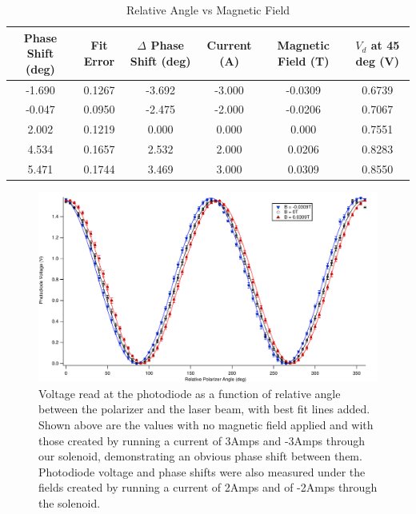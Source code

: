 \documentclass[prb,preprint]{revtex4-1}
\begin{document}
\begin{table}[H]
\centering
\caption{Relative Angle vs Magnetic Field}


\renewcommand{\arraystretch}{1.8}
\begin{ruledtabular}
\begin{tabular}{c c c c c c}
Phase Shift (deg) & Fit Error & $\Delta$ Phase Shift (deg) & Current (A) & Magnetic Field (T) & $V_d$ at 45 deg (V)\\
\hline
-1.690 & 0.1267 & -3.692 & -3.000 & -0.0309 & 0.6739 \\
-0.047 & 0.0950 & -2.475 & -2.000 & -0.0206 & 0.7067 \\
2.002  & 0.1219 & 0.000  & 0.000 & 0.000   & 0.7551 \\
4.534  & 0.1657 & 2.532  & 2.000 & 0.0206  & 0.8283 \\
5.471  & 0.1744 & 3.469  & 3.000 & 0.0309  & 0.8550 \\
\end{tabular}
\end{ruledtabular}
\label{AnglevsB}
\end{table}

\begin{figure}[H]
\centering
\includegraphics[width=180mm]{FaradaySineWave.pdf}
\caption{Voltage read at the photodiode as a function of relative angle between the polarizer and the laser beam, with best fit lines added. Shown above are the values with no magnetic field applied and with those created by running a current of 3Amps and -3Amps through our solenoid, demonstrating an obvious phase shift between them. Photodiode voltage and phase shifts were also measured under the fields created by running a current of 2Amps and of -2Amps through the solenoid.}
\label{wave_plot}
\end{figure}
\end{document}
